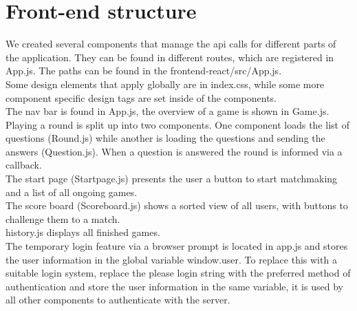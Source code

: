 \chapter{Front-end structure}
We created several components that manage the api calls for different parts of the application. They can be found in different routes, which are registered in App.js. The paths can be found in the frontend-react/src/App.js. \\
Some design elements that apply globally are in index.css, while some more component specific design tags are set inside of the components.\\

 The nav bar is found in App.js, the overview of a game is shown in Game.js. Playing a round is split up into two components. One component loads the list of questions (Round.js) while another is loading the questions and sending the answers (Question.js). When a question is answered the round is informed via a callback.\\
 The start page (Startpage.js) presents the user a button to start matchmaking and a list of all ongoing games.\\
 The score board (Scoreboard.js) shows a sorted view of all users, with buttons to challenge them to a match.\\
 history.js displays all finished games.\\
 The temporary login feature via a browser prompt is located in app.js and stores the user information in the global variable window.user. To replace this with a suitable login system, replace the please login string with the preferred method of authentication and store the user information in the same variable, it is used by all other components to authenticate with the server.
